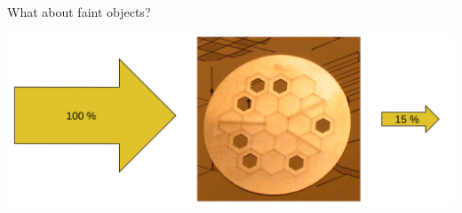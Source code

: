 \documentclass[10pt]{beamer}
\newenvironment{wideitemize}{\itemize\addtolength{\itemsep}{10pt}}{\enditemize}
\begin{document}
%

%

\begin{frame}{What about faint objects?}
  \begin{center}
    \includegraphics[width=\linewidth]{figures/mask_blocks_light.png}
  \end{center}
\end{frame}


\end{document}
